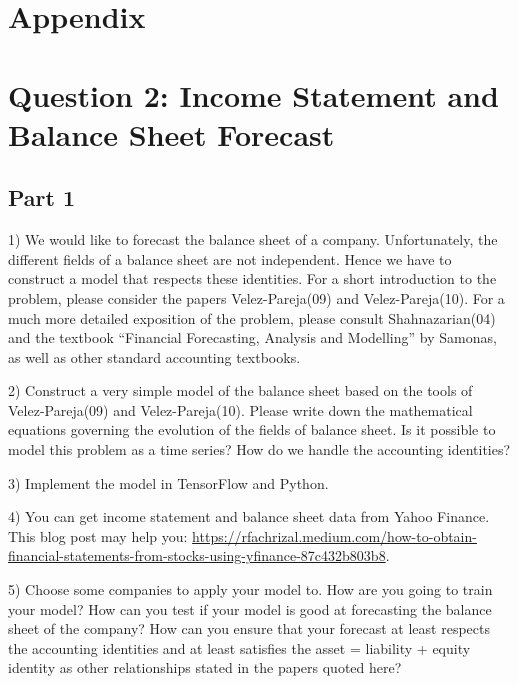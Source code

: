 \documentclass[12pt]{article}
\numberwithin{equation}{section}
\begin{document}
\newpage
\appendix
\setcounter{page}{1} %
\section*{Appendix} %
\renewcommand{\thetable}{A\arabic{table}} %
\renewcommand{\thefigure}{A\arabic{figure}} %

\section*{Question 2: Income Statement and Balance Sheet Forecast}
\label{sec:question}

\subsection*{Part 1}

1) We would like to forecast the balance sheet of a company. Unfortunately, the different fields of a balance sheet are not independent. Hence we have to construct a model that respects these identities. For a short introduction to the problem, please consider the papers Velez-Pareja(09) and Velez-Pareja(10). For a much more detailed exposition of the problem, please consult Shahnazarian(04) and the textbook “Financial Forecasting, Analysis and Modelling” by Samonas, as well as other standard accounting textbooks.

2) Construct a very simple model of the balance sheet based on the tools of Velez-Pareja(09) and Velez-Pareja(10). Please write down the mathematical equations governing the evolution of the fields of balance sheet. Is it possible to model this problem as a time series? How do we handle the accounting identities?

3) Implement the model in TensorFlow and Python.

4) You can get income statement and balance sheet data from Yahoo Finance. This blog post may help you: \url{https://rfachrizal.medium.com/how-to-obtain-financial-statements-from-stocks-using-yfinance-87c432b803b8}.

5) Choose some companies to apply your model to. How are you going to train your model? How can you test if your model is good at forecasting the balance sheet of the company? How can you ensure that your forecast at least respects the accounting identities and at least satisfies the asset = liability + equity identity as other relationships stated in the papers quoted here?
\end{document}
